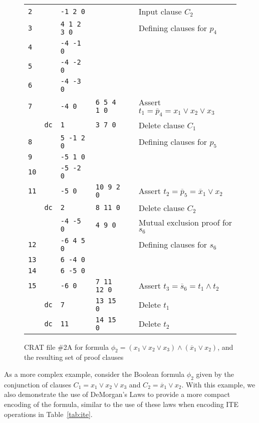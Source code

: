 \documentclass{llncs}
\newcommand{\obar}[1]{\overline{#1}}
\begin{document}
\begin{figure}
\begin{center}
\begin{tabular}{lcllll}
    {\tt 2} &    & {\tt -1 2 0}  &            & & Input clause $C_2$ \\
    {\tt 3} &   & {\tt 4 1 2 3 0} &     & & Defining clauses for $p_4$ \\
    {\tt 4} &   & {\tt -4 -1 0} &     & & \\
    {\tt 5} &   & {\tt -4 -2 0} &     & & \\
    {\tt 6} &   & {\tt -4 -3 0} &     & & \\
    {\tt 7} &   & {\tt -4 0} & {\tt 6 5 4 1 0} & & Assert $t_1 = \obar{p}_4 = x_1 \lor x_2 \lor x_3$ \\
            & {\tt dc}  & {\tt 1 } & {\tt 3 7 0} & & Delete clause $C_1$\\

    {\tt 8} &   & {\tt 5 -1 2 0}  &    & & Defining clauses for $p_5$ \\ 
    {\tt 9} &   & {\tt -5 1 0}    &  & & \\
    {\tt 10} &   & {\tt -5 -2 0}    &  & & \\ 
    {\tt 11} &  & {\tt -5 0} & {\tt 10 9 2 0}  & & Assert $t_2 = \obar{p}_5 = \obar{x}_1 \lor x_2$ \\
             & {\tt dc}  & {\tt 2 } & {\tt 8 11 0} & & Delete clause $C_2$\\
             &          & {\tt -4 -5 0} & {\tt 4 9 0}  & & Mutual exclusion proof for $s_6$ \\
    {\tt 12} &   & {\tt -6 4 5 0}  &     & & Defining clauses for $s_6$ \\ 
    {\tt 13} &   & {\tt  6 -4 0}    &  &  \\  
    {\tt 14} &   & {\tt  6 -5 0}    &  & &  \\
    {\tt 15} &   & {\tt -6 0}       & {\tt 7 11 12 0} & & Assert $t_3 = \obar{s}_6 = t_1 \land t_2$ \\
             & {\tt dc}  & {\tt 7}          & {\tt 13 15 0} & & Delete $t_1$\\
             & {\tt dc}  & {\tt 11}         & {\tt 14 15 0} & & Delete $t_2$\\
  \end{tabular}
  \end{center}  
  \caption{CRAT file \#2A for formula $\phi_2 = (x_1 \lor x_2 \lor x_3) \land (\obar{x}_1 \lor x_2)$, and the resulting set of proof clauses}
  \label{fig:p2-bdd:crat}
\end{figure}

As a more complex example, consider the Boolean formula $\phi_2$ given
by the conjunction of clauses $C_1 = x_1 \lor x_2 \lor x_3$ and $C_2 =
\obar{x}_1 \lor x_2$.  With this example, we also demonstrate the use
of DeMorgan's Laws to provide a more compact encoding of the formula,
similar to the use of these laws when encoding ITE operations in
Table~\ref{tab:ite}.
\end{document}
